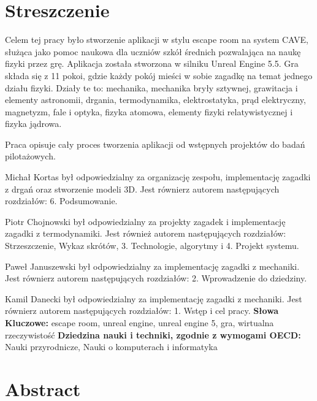 \chapter*{Streszczenie}
Celem tej pracy było stworzenie aplikacji w stylu escape room na system CAVE, służąca jako pomoc naukowa dla uczniów szkół średnich pozwalająca na naukę fizyki przez grę. Aplikacja została stworzona w silniku Unreal Engine 5.5. Gra składa się z 11 pokoi, gdzie każdy pokój mieści w sobie zagadkę na temat jednego działu fizyki. Działy te to: mechanika, mechanika bryły sztywnej, grawitacja i elementy astronomii, drgania, termodynamika, elektrostatyka, prąd elektryczny, magnetyzm, fale i optyka, fizyka atomowa, elementy fizyki relatywistycznej i fizyka jądrowa.

Praca opisuje cały proces tworzenia aplikacji od wstępnych projektów do badań pilotażowych. 

Michał Kortas był odpowiedzialny za organizację zespołu, implementację zagadki z drgań oraz stworzenie modeli 3D. Jest równierz autorem następujących rozdziałów: 6. Podsumowanie.

Piotr Chojnowski był odpowiedzialny za projekty zagadek i implementację zagadki z termodynamiki. Jest również autorem następujących rozdziałów: Strzeszczenie, Wykaz skrótów, 3. Technologie, algorytmy i 4. Projekt systemu.

Paweł Januszewski był odpowiedzialny za implementację zagadki z mechaniki. Jest równierz autorem następujących rozdziałów: 2. Wprowadzenie do dziedziny.

Kamil Danecki był odpowiedzialny za implementację zagadki z mechaniki. Jest równierz autorem następujących rozdziałów: 1. Wstęp i cel pracy.
\newline
\newline
\textbf{Słowa Kluczowe:} escape room, unreal engine, unreal engine 5, gra, wirtualna rzeczywistość
\newline
\newline
\textbf{Dziedzina nauki i techniki, zgodnie z wymogami OECD:} Nauki przyrodnicze, Nauki o komputerach i informatyka

\chapter*{Abstract}
